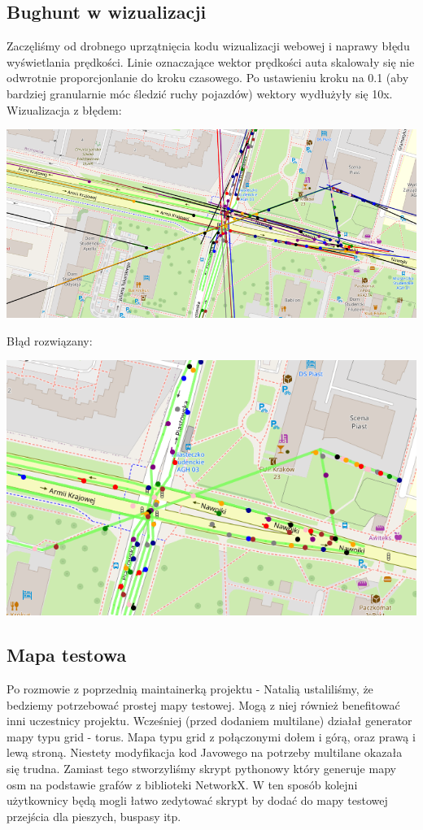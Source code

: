 \documentclass[a4paper]{article}
\begin{document}
\subsection{Bughunt w wizualizacji}

Zaczęliśmy od drobnego uprzątnięcia kodu wizualizacji webowej i naprawy błędu wyświetlania prędkości. Linie oznaczające wektor prędkości auta skalowały się nie odwrotnie proporcjonlanie do kroku czasowego. Po ustawieniu kroku na 0.1 (aby bardziej granularnie móc śledzić ruchy pojazdów) wektory wydłużyły się 10x. Wizualizacja z błędem:

\includegraphics[width=1\textwidth]{./imgs/bug.png}

Błąd rozwiązany:

\includegraphics[width=1\textwidth]{./imgs/bug_solved.png}

\subsection{Mapa testowa}

Po rozmowie z poprzednią maintainerką projektu - Natalią ustaliliśmy, że bedziemy potrzebować prostej mapy testowej. Mogą z niej również benefitować inni uczestnicy projektu. Wcześniej (przed dodaniem multilane) działał generator mapy typu grid - torus. Mapa typu grid z połączonymi dołem i górą, oraz prawą i lewą stroną. Niestety modyfikacja kod Javowego na potrzeby multilane okazała się trudna. Zamiast tego stworzyliśmy skrypt pythonowy który generuje mapy osm na podstawie grafów z biblioteki NetworkX. W ten sposób kolejni użytkownicy będą mogli łatwo zedytować skrypt by dodać do mapy testowej przejścia dla pieszych, buspasy itp.
\end{document}
